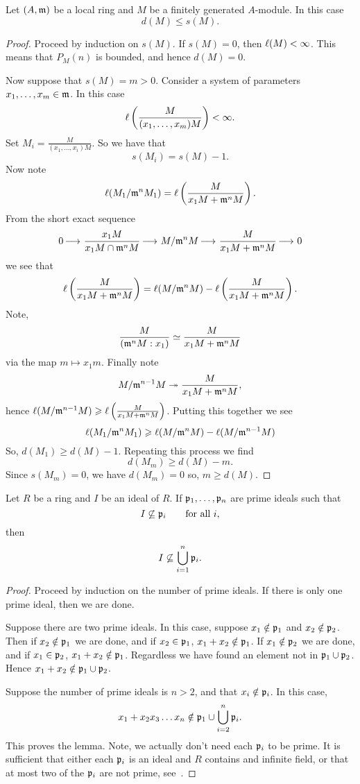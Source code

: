 \documentclass{ximera}
\begin{document}
\begin{lemma}[$\boldsymbol{d(M)\le s(M)}$]\label{L:ds}
  Let $(A,\mathfrak{m})$ be a local ring and $M$ be a finitely generated
  $A$-module. In this case
  \[
  d(M)\le s(M).
  \]
  \begin{proof}
    Proceed by induction on $s(M)$. If $s(M) = 0$, then
    $\ell(M)< \infty$. This means that $P_M(n)$ is bounded, and hence
    $d(M) = 0$.

    Now suppose that $s(M) = m >0$. Consider a system of
    parameters $x_1,\dots, x_m\in \mathfrak{m}$. In this case
    \[
    \ell\left( \frac{M}{(x_1,\dots,x_m)M} \right)<\infty.
    \]
    Set $M_i = \frac{M}{(x_1,\dots,x_i)M}$. So we have that
    \[
    s(M_i) = s(M)-1.
    \]
    Now note
    \[
    \ell(M_1/\mathfrak{m}^n M_1) = \ell\left(\frac{M}{x_1 M + \mathfrak{m}^n M}\right).
    \]
    From the short exact sequence
    \[
    0\mathop{\longrightarrow\,}\limits \frac{x_1M}{x_1 M \cap \mathfrak{m}^n M} \mathop{\longrightarrow\,}\limits  M/\mathfrak{m}^n M \mathop{\longrightarrow\,}\limits \frac{M}{x_1 M + \mathfrak{m}^n M}\mathop{\longrightarrow\,}\limits 0
    \]
    we see that
    \[
    \ell\left(\frac{M}{x_1 M + \mathfrak{m}^n M}\right) = \ell(M/\mathfrak{m}^n M) - \ell \left(\frac{M}{x_1 M + \mathfrak{m}^n M}\right).
    \]
    Note,
    \[
    \frac{M}{(\mathfrak{m}^nM:x_1)}\simeq \frac{M}{x_1 M + \mathfrak{m}^n M}
    \]
    via the map $m\mapsto x_1 m$. Finally note
    \[
    M/\mathfrak{m}^{n-1}M \twoheadrightarrow \frac{M}{x_1 M + \mathfrak{m}^n M},
    \]
    hence $\ell(M/\mathfrak{m}^{n-1}M)\geqslant \ell\left(\frac{M}{x_1 M + \mathfrak{m}^n
      M}\right)$. Putting this together we see
    \[
    \ell(M_1/\mathfrak{m}^n M_1) \geqslant \ell(M/\mathfrak{m}^n M) - \ell(M/\mathfrak{m}^{n-1}M)
    \]
    So, $d(M_1) \ge d(M) - 1$. Repeating this process we find
    \[
    d(M_m) \ge d(M) -m.
    \]
    Since $s(M_m) = 0$, we have $d(M_m) = 0$ so, $m\ge d(M)$.
  \end{proof}
\end{lemma}





\begin{lemma}\label{L:PA}
Let $R$ be a ring and $I$ be an ideal of $R$.  If $\mathfrak{p}_1,\ldots,\mathfrak{p}_n$
are prime ideals such that
\[
I \not\subseteq \mathfrak{p}_i \qquad\text{for all $i$,}
\]
then 
\[
I \not\subseteq \bigcup_{i = 1}^n \mathfrak{p}_i.
\]
\begin{proof}
  Proceed by induction on the number of prime ideals. If there is only
  one prime ideal, then we are done.

  Suppose there are two prime ideals. In this case, suppose
  $x_1\notin\mathfrak{p}_1$ and $x_2\notin\mathfrak{p}_2$. Then if $x_2\notin \mathfrak{p}_1$ we
  are done, and if $x_2\in \mathfrak{p}_1$, $x_1+x_2\notin \mathfrak{p}_1$.  If $x_1\notin
  \mathfrak{p}_2$ we are done, and if $x_1\in \mathfrak{p}_2$, $x_1+x_2\notin
  \mathfrak{p}_1$. Regardless we have found an element not in $\mathfrak{p}_1\cup \mathfrak{p}_2$.
  Hence $x_1+x_2\notin\mathfrak{p}_1\cup\mathfrak{p}_2$.
  
  Suppose the number of prime ideals is $n>2$, and that
  $x_i\notin\mathfrak{p}_i$. In this case,
  \[
  x_1+ x_2x_3\dots x_n \notin \mathfrak{p}_1\cup \bigcup_{i=2}^n \mathfrak{p}_i.
  \]
  This proves the lemma. Note, we actually don't need each $\mathfrak{p}_i$ to
  be prime. It is sufficient that either each $\mathfrak{p}_i$ is an ideal and
  $R$ contains and infinite field, or that at most two of the $\mathfrak{p}_i$
  are not prime, see~\cite{dE1995}.
\end{proof}
\end{lemma}
\end{document}
